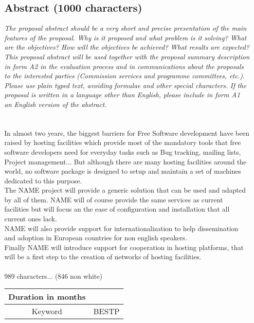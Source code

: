 \documentclass[a4paper,11pt]{report}
\begin{document}
\subsection*{Abstract (1000 characters)}
\textit{The proposal abstract should be a very short and precise presentation
of the main features of the proposal. Why is it proposed and what problem is it
solving? What are the objectives? How will the objectives be achieved? What
results are expected? This proposal abstract will be used together with the
proposal summary description in form A2 in the evaluation process and in
communications about the proposals to the interested parties (Commission
services and programme committees, etc.). Please use plain typed text, avoiding
formulae and other special characters. If the proposal is written in a language
other than English, please include in form A1 an English version of the
abstract.} \\ \\ \\
In almost two years, the biggest barriers for Free Software development have
been raised by hosting facilities which provide most of the mandatory tools
that free software developers need for everyday tasks such as Bug tracking,
mailing lists, Project management... But although there are
many hosting facilities around the world, no software package is designed to
setup and maintain a set of machines dedicated to this purpose. \\ 
The NAME
project will provide a generic solution that can be used and adapted by all of
them.
NAME will of course provide the same services as current facilities but
will focus an the ease of configuration and installation that all current ones
lack. \\
NAME will also provide support for internationalization to help dissemination and adoption in European countries for non english speakers.\\
Finally NAME will introduce support for cooperation in hosting platforms, 
that will be a first step to the creation of networks 
of hosting facilities. 
\\ \\ 
989 characters... (846 non white)
\begin{tabular}{|c|c|}
\hline
Duration in months & \\ \hline
Keyword & BESTP \\ \hline
\end{tabular}
\end{document}
